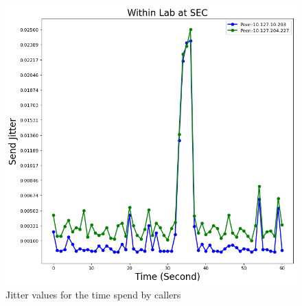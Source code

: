 	\begin{figure}[!t]
		\begin{minipage}{\textwidth}
			\includegraphics[scale=0.38]{Images/experiment/senarios/df_in_lab.png}
		\end{minipage}
		\caption{Jitter values for the time spend by callers}
		\label{fig:scene-out-1}
	\end{figure}


